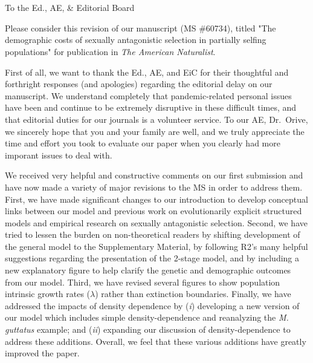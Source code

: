 \documentclass[11pt]{article}
\begin{document}




\section*{}
\noindent To the Ed., AE, \& Editorial Board
\bigskip

\noindent Please consider this revision of our manuscript (MS \#60734), titled "The demographic costs of sexually antagonistic selection in partially selfing populations" for publication in \textit{The American Naturalist}. 
\bigskip

\noindent First of all, we want to thank the Ed., AE, and EiC for their thoughtful and forthright responses (and apologies) regarding the editorial delay on our manuscript. We understand completely that pandemic-related personal issues have been and continue to be extremely disruptive in these difficult times, and that editorial duties for our journals is a volunteer service. To our AE, Dr.~Orive, we sincerely hope that you and your family are well, and we truly appreciate the time and effort you took to evaluate our paper when you clearly had more imporant issues to deal with.
\bigskip

\noindent We received very helpful and constructive comments on our first submission and have now made a variety of major revisions to the MS in order to address them. First, we have made significant changes to our introduction to develop conceptual links between our model and previous work on evolutionarily explicit structured models and empirical research on sexually antagonistic selection. Second, we have tried to lessen the burden on non-theoretical readers by shifting development of the general model to the Supplementary Material, by following R2's many helpful suggestions regarding the presentation of the 2-stage model, and by including a new explanatory figure to help clarify the genetic and demographic outcomes from our model. Third, we have revised several figures to show population intrinsic growth rates ($\lambda$) rather than extinction boundaries. Finally, we have addressed the impacts of density dependence by ({\itshape i}) developing a new version of our model which includes simple density-dependence and reanalyzing the {\itshape M. guttatus} example; and ({\itshape ii}) expanding our discussion of density-dependence to address these additions. Overall, we feel that these various additions have greatly improved the paper. 
\bigskip
\end{document}
